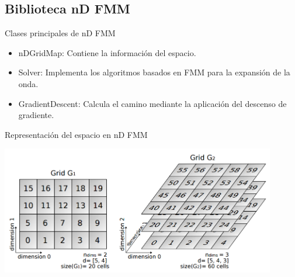 \documentclass[10pt]{beamer}
\begin{document}
\subsection{Biblioteca nD FMM}
\begin{frame}
	Clases principales de nD FMM
	\begin{itemize}
		\item nDGridMap: Contiene la información del espacio.
		\item Solver: Implementa los algoritmos basados en FMM para la expansión de la onda.
		\item GradientDescent: Calcula el camino mediante la aplicación del descenso de gradiente.
	\end{itemize}
\end{frame}

\begin{frame}{Representación del espacio en nD FMM}
	\begin{center}	
	\includegraphics[width=0.9\textwidth,height=0.8\textheight,keepaspectratio]{grid1}	
	\end{center}
\end{frame}

\end{document}
